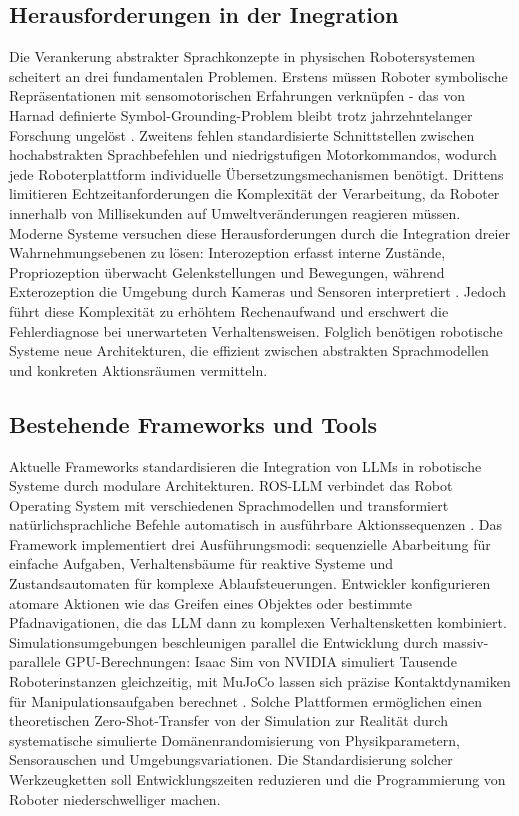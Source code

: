 \subsection{Herausforderungen in der Inegration}
Die Verankerung abstrakter Sprachkonzepte in physischen Robotersystemen
scheitert an drei fundamentalen Problemen. Erstens müssen Roboter symbolische
Repräsentationen mit sensomotorischen Erfahrungen verknüpfen - das von Harnad
definierte Symbol-Grounding-Problem bleibt trotz jahrzehntelanger Forschung
ungelöst . Zweitens fehlen
standardisierte Schnittstellen zwischen hochabstrakten Sprachbefehlen und
niedrigstufigen Motorkommandos, wodurch jede Roboterplattform individuelle
Übersetzungsmechanismen benötigt. Drittens limitieren Echtzeitanforderungen die
Komplexität der Verarbeitung, da Roboter innerhalb von Millisekunden auf
Umweltveränderungen reagieren müssen. Moderne Systeme versuchen diese
Herausforderungen durch die Integration dreier Wahrnehmungsebenen zu lösen:
Interozeption erfasst interne Zustände, Propriozeption überwacht
Gelenkstellungen und Bewegungen, während Exterozeption die Umgebung durch
Kameras und Sensoren interpretiert . Jedoch führt diese
Komplexität zu erhöhtem Rechenaufwand und erschwert die Fehlerdiagnose bei
unerwarteten Verhaltensweisen. Folglich benötigen robotische Systeme neue
Architekturen, die effizient zwischen abstrakten Sprachmodellen und konkreten
Aktionsräumen vermitteln.

\subsection{Bestehende Frameworks und Tools} Aktuelle Frameworks standardisieren
die Integration von LLMs in robotische Systeme durch modulare Architekturen.
ROS-LLM verbindet das Robot Operating System mit verschiedenen Sprachmodellen
und transformiert natürlichsprachliche Befehle automatisch in ausführbare
Aktionssequenzen . Das Framework implementiert
drei Ausführungsmodi: sequenzielle Abarbeitung für einfache Aufgaben,
Verhaltensbäume für reaktive Systeme und Zustandsautomaten für komplexe
Ablaufsteuerungen. Entwickler konfigurieren atomare Aktionen wie das Greifen
eines Objektes oder bestimmte Pfadnavigationen, die das LLM dann zu komplexen
Verhaltensketten kombiniert. Simulationsumgebungen beschleunigen parallel die
Entwicklung durch massiv-parallele GPU-Berechnungen: Isaac Sim von NVIDIA
simuliert Tausende Roboterinstanzen gleichzeitig, mit MuJoCo lassen sich präzise
Kontaktdynamiken für Manipulationsaufgaben berechnet . Solche Plattformen ermöglichen einen theoretischen Zero-Shot-Transfer
von der Simulation zur Realität durch systematische simulierte
Domänenrandomisierung von Physikparametern, Sensorauschen und
Umgebungsvariationen. Die Standardisierung solcher Werkzeugketten soll
Entwicklungszeiten reduzieren und die Programmierung von Roboter
niederschwelliger machen.
